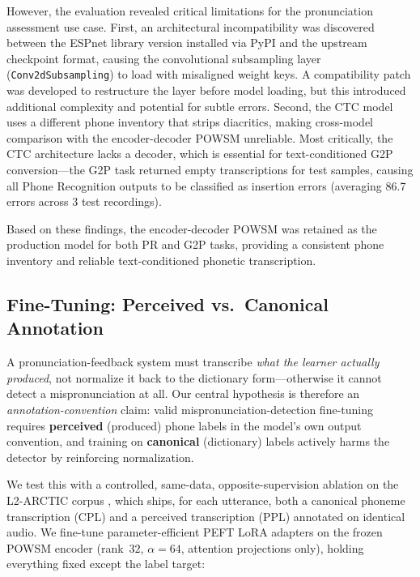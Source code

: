 \documentclass[a4paper,12pt]{report}
\begin{document}
However, the evaluation revealed critical limitations for the pronunciation assessment use case. First, an architectural incompatibility was discovered between the ESPnet library version installed via PyPI and the upstream checkpoint format, causing the convolutional subsampling layer (\texttt{Conv2dSubsampling}) to load with misaligned weight keys. A compatibility patch was developed to restructure the layer before model loading, but this introduced additional complexity and potential for subtle errors. Second, the CTC model uses a different phone inventory that strips diacritics, making cross-model comparison with the encoder-decoder POWSM unreliable. Most critically, the CTC architecture lacks a decoder, which is essential for text-conditioned G2P conversion---the G2P task returned empty transcriptions for test samples, causing all Phone Recognition outputs to be classified as insertion errors (averaging 86.7 errors across 3 test recordings).

Based on these findings, the encoder-decoder POWSM was retained as the production model for both PR and G2P tasks, providing a consistent phone inventory and reliable text-conditioned phonetic transcription.

\subsection{Fine-Tuning: Perceived vs.\ Canonical Annotation}
\label{sec:finetuning-method}

A pronunciation-feedback system must transcribe \emph{what the learner actually produced}, not normalize it back to the dictionary form---otherwise it cannot detect a mispronunciation at all. Our central hypothesis is therefore an \emph{annotation-convention} claim: valid mispronunciation-detection fine-tuning requires \textbf{perceived} (produced) phone labels in the model's own output convention, and training on \textbf{canonical} (dictionary) labels actively harms the detector by reinforcing normalization.

We test this with a controlled, same-data, opposite-supervision ablation on the L2-ARCTIC corpus \cite{l2arctic}, which ships, for each utterance, both a canonical phoneme transcription (CPL) and a perceived transcription (PPL) annotated on identical audio. We fine-tune parameter-efficient PEFT LoRA adapters \cite{lora} on the frozen POWSM encoder (rank~$32$, $\alpha{=}64$, attention projections only), holding everything fixed except the label target:
\end{document}

